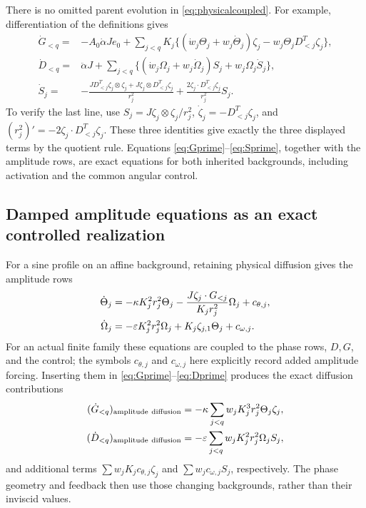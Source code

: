 There is no omitted parent evolution in \eqref{eq:physicalcoupled}.
For example, differentiation of the definitions gives
\begin{align}
 \dot G_{<q}={}&-A_0\dot\alpha Je_0+
 \sum_{j<q}K_j\{(\dot w_j\Theta_j+w_j\dot\Theta_j)\zeta_j
 -w_j\Theta_jD_{<j}^T\zeta_j\},\label{eq:Gprime}\\
 \dot D_{<q}={}&\ddot\alpha J+
 \sum_{j<q}\{(\dot w_j\Omega_j+w_j\dot\Omega_j)S_j
 +w_j\Omega_j\dot S_j\},\label{eq:Dprime}\\
 \dot S_j={}&-\frac{JD_{<j}^T\zeta_j\otimes\zeta_j
 +J\zeta_j\otimes D_{<j}^T\zeta_j}{r_j^2}
 +\frac{2\zeta_j\cdot D_{<j}^T\zeta_j}{r_j^2}S_j.
 \label{eq:Sprime}
\end{align}
To verify the last line, use $S_j=J\zeta_j\otimes\zeta_j/r_j^2$,
$\dot\zeta_j=-D_{<j}^T\zeta_j$, and
$(r_j^2)'=-2\zeta_j\cdot D_{<j}^T\zeta_j$. These three
identities give exactly the three displayed terms by the quotient
rule. Equations \eqref{eq:Gprime}--\eqref{eq:Sprime}, together
with the amplitude rows, are exact equations for both inherited
backgrounds, including activation and the common angular control.

\subsection{Damped amplitude equations as an exact controlled realization}
For a sine profile on an affine background, retaining physical
diffusion gives the amplitude rows
\begin{align}
 \dot\Theta_j&=-\kappa K_j^2r_j^2\Theta_j
 -\frac{J\zeta_j\cdot G_{<j}}{K_jr_j^2}\Omega_j+c_{\theta,j},\notag\\
 \dot\Omega_j&=-\varepsilon K_j^2r_j^2\Omega_j
 +K_j\zeta_{j,1}\Theta_j+c_{\omega,j}.
 \label{eq:dampedjet}
\end{align}
For an actual finite family these equations are coupled to the
phase rows, $D,G$, and the control; the symbols $c_{\theta,j}$ and
$c_{\omega,j}$ here explicitly record added amplitude forcing.
Inserting them in \eqref{eq:Gprime}--\eqref{eq:Dprime} produces
the exact diffusion contributions
\begin{align}
 (\dot G_{<q})_{\rm amplitude\ diffusion}
 &=-\kappa\sum_{j<q}w_jK_j^3r_j^2\Theta_j\zeta_j,\notag\\
 (\dot D_{<q})_{\rm amplitude\ diffusion}
 &=-\varepsilon\sum_{j<q}w_jK_j^2r_j^2\Omega_jS_j,
 \label{eq:parentdiffusion}
\end{align}
and additional terms $\sum w_jK_jc_{\theta,j}\zeta_j$ and
$\sum w_jc_{\omega,j}S_j$, respectively. The phase geometry
and feedback then use those changing backgrounds, rather than
their inviscid values.

